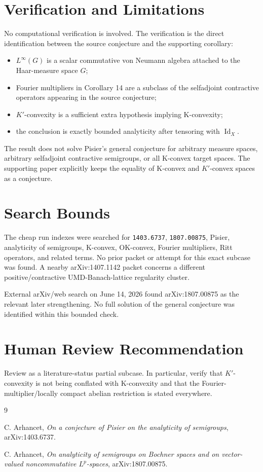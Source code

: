 \documentclass[11pt]{article}
\newcommand{\Id}{\operatorname{Id}}
\begin{document}
\section*{Verification and Limitations}

No computational verification is involved. The verification is the direct
identification between the source conjecture and the supporting corollary:
\begin{itemize}
  \item $L^\infty(G)$ is a scalar commutative von Neumann algebra attached to
  the Haar-measure space $G$;
  \item Fourier multipliers in Corollary 14 are a subclass of the selfadjoint
  contractive operators appearing in the source conjecture;
  \item $K'$-convexity is a sufficient extra hypothesis implying K-convexity;
  \item the conclusion is exactly bounded analyticity after tensoring with
  $\Id_X$.
\end{itemize}

The result does not solve Pisier's general conjecture for arbitrary measure
spaces, arbitrary selfadjoint contractive semigroups, or all K-convex target
spaces. The supporting paper explicitly keeps the equality of K-convex and
$K'$-convex spaces as a conjecture.

\section*{Search Bounds}

The cheap run indexes were searched for \texttt{1403.6737}, \texttt{1807.00875},
Pisier, analyticity of semigroups, K-convex, OK-convex, Fourier multipliers,
Ritt operators, and related terms. No prior packet or attempt for this exact
subcase was found. A nearby arXiv:1407.1142 packet concerns a different
positive/contractive UMD-Banach-lattice regularity cluster.

External arXiv/web search on June 14, 2026 found arXiv:1807.00875 as the
relevant later strengthening. No full solution of the general conjecture was
identified within this bounded check.

\section*{Human Review Recommendation}

Review as a literature-status partial subcase. In particular, verify that
$K'$-convexity is not being conflated with K-convexity and that the
Fourier-multiplier/locally compact abelian restriction is stated everywhere.

\begin{thebibliography}{9}

C. Arhancet,
\emph{On a conjecture of Pisier on the analyticity of semigroups},
arXiv:1403.6737.

C. Arhancet,
\emph{On analyticity of semigroups on Bochner spaces and on vector-valued
noncommutative $L^p$-spaces},
arXiv:1807.00875.

\end{thebibliography}
\end{document}
